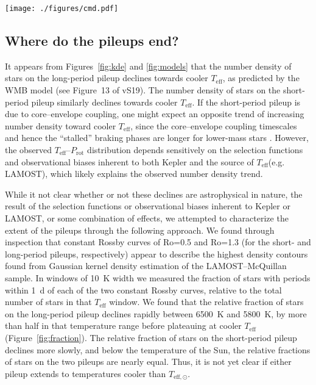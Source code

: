 \documentclass[trackchanges,twocolumn]{aastex631}
\newcommand{\lamostmcq}{LAMOST--McQuillan\xspace}
\newcommand{\jvs}{vS19\xspace}
\newcommand{\hall}{H21\xspace}
\newcommand{\santos}{S21\xspace}
\newcommand{\teff}{\ensuremath{T_{\mathrm{eff}}}\xspace}
\newcommand{\tsun}{$T_\mathrm{eff,\odot}$\xspace}
\newcommand{\prot}{\ensuremath{P_\mathrm{rot}}\xspace}
\begin{document}
\begin{figure*}
    \texttt{[image: ./figures/cmd.pdf]}
    \caption{Gaia DR2 color-magnitude diagram. In each panel, a 2-d histogram of all Kepler targets is shown in grayscale, with darker shades representing a higher number of targets in each cell. The estimated position of the Sun is indicated by the black point, based on the calibration of \citet{Casagrande2018}. In the middle and right panels, the \santos targets with photometric rotation period detections are overplotted in orange. In the right panel, the CKS long-period pileup stars identified in this work are shown by blue points and a Gaussian kernel density estimation of the \hall asteroseismic sample is shown by blue contours. No reddening corrections were performed to the photometry in this figure.}
    \label{fig:cmd}
\end{figure*}


\subsection{Where do the pileups end?} \label{subsec:extent}
It appears from Figures~\ref{fig:kde} and \ref{fig:models} that the number density of stars on the long-period pileup declines towards cooler \teff, as predicted by the WMB model (see Figure~13 of \jvs). The number density of stars on the short-period pileup similarly declines towards cooler \teff. If the short-period pileup is due to core–envelope coupling, one might expect an opposite trend of increasing number density toward cooler \teff, since the core–envelope coupling timescales and hence the ``stalled'' braking phases are longer for lower-mass stars \citep{Curtis2020}. However, the observed \teff--\prot distribution depends sensitively on the selection functions and observational biases inherent to both Kepler and the source of \teff (e.g. LAMOST), which likely explains the observed number density trend. 

While it not clear whether or not these declines are astrophysical in nature, the result of the selection functions or observational biases inherent to Kepler or LAMOST, or some combination of effects, we attempted to characterize the extent of the pileups through the following approach. We found through inspection that constant Rossby curves of Ro=0.5 and Ro=1.3 (for the short- and long-period pileups, respectively) appear to describe the highest density contours found from Gaussian kernel density estimation of the \lamostmcq sample. In windows of 10~K width we measured the fraction of stars with periods within 1~d of each of the two constant Rossby curves, relative to the total number of stars in that \teff window. We found that the relative fraction of stars on the long-period pileup declines rapidly between 6500~K and 5800~K, by more than half in that temperature range before plateauing at cooler \teff (Figure~\ref{fig:fraction}). The relative fraction of stars on the short-period pileup declines more slowly, and below the temperature of the Sun, the relative fractions of stars on the two pileups are nearly equal. Thus, it is not yet clear if either pileup extends to temperatures cooler than \tsun.
\end{document}

